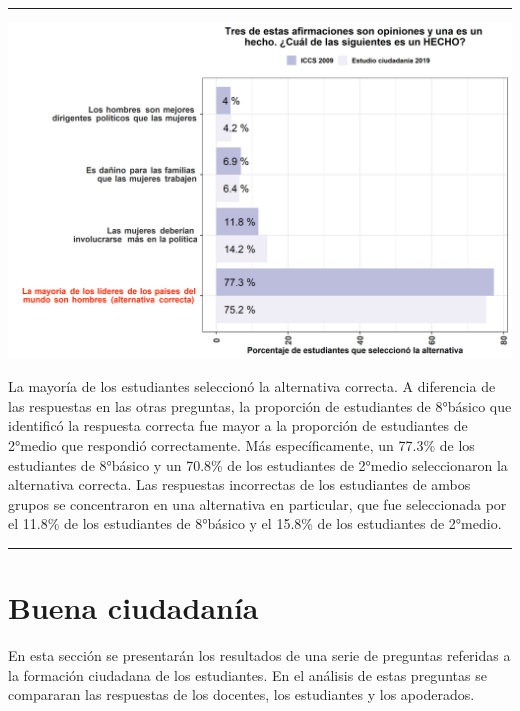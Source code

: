 \documentclass[
  14pt,
]{book}
\let\origfigure\figure
\let\endorigfigure\endfigure
\renewenvironment{figure}[1][2] {
  \expandafter\origfigure\expandafter[H]
} {
  \endorigfigure
}
\begin{document}
\begin{center}\rule{0.5\linewidth}{0.5pt}\end{center}

\begin{figure}[!ht]

{\centering \includegraphics[width=0.8\linewidth,]{images/graph_p6} 

}

\caption{Comparación con ICCS: Afirmación que corresponde a un hecho}\label{fig:unnamed-chunk-24}
\end{figure}

La mayoría de los estudiantes seleccionó la alternativa correcta. A diferencia de las respuestas en las otras preguntas, la proporción de estudiantes de 8°básico que identificó la respuesta correcta fue mayor a la proporción de estudiantes de 2°medio que respondió correctamente. Más específicamente, un 77.3\% de los estudiantes de 8°básico y un 70.8\% de los estudiantes de 2°medio seleccionaron la alternativa correcta. Las respuestas incorrectas de los estudiantes de ambos grupos se concentraron en una alternativa en particular, que fue seleccionada por el 11.8\% de los estudiantes de 8°básico y el 15.8\% de los estudiantes de 2°medio.

\begin{center}\rule{0.5\linewidth}{0.5pt}\end{center}

\hypertarget{buena-ciudadanuxeda}{%
\section{Buena ciudadanía}\label{buena-ciudadanuxeda}}

En esta sección se presentarán los resultados de una serie de preguntas referidas a la formación ciudadana de los estudiantes. En el análisis de estas preguntas se compararan las respuestas de los docentes, los estudiantes y los apoderados.
\end{document}
